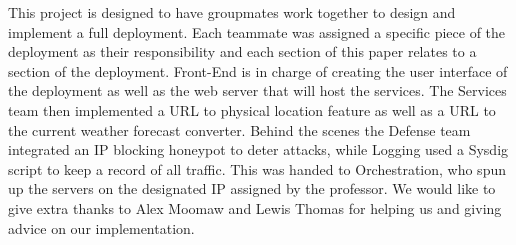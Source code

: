 This project is designed to have groupmates work together to design and implement a full deployment. Each teammate was assigned a specific piece of the deployment as their responsibility and each section of this paper relates to a section of the deployment. Front-End is in charge of creating the user interface of the deployment as well as the web server that will host the services. The Services team then implemented a URL to physical location feature as well as a URL to the current weather forecast converter. Behind the scenes the Defense team integrated an IP blocking honeypot to deter attacks, while Logging used a Sysdig script to keep a record of all traffic. This was handed to Orchestration, who spun up the servers on the designated IP assigned by the professor. We would like to give extra thanks to Alex Moomaw and Lewis Thomas for helping us and giving advice on our implementation.
